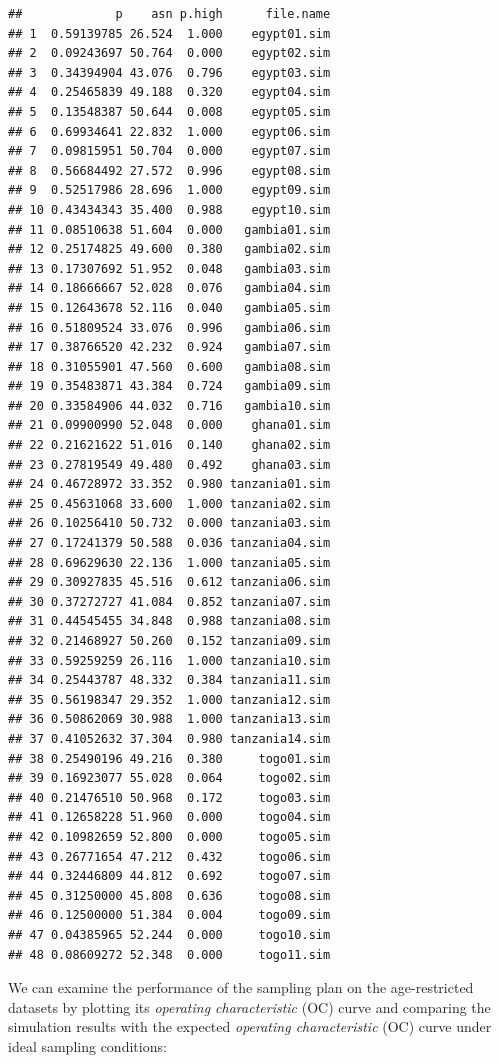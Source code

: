 \documentclass[12pt,a4paper]{book}
\theoremstyle{definition}
\theoremstyle{definition}
\theoremstyle{definition}
\theoremstyle{remark}
\begin{document}
\begin{verbatim}
##             p    asn p.high      file.name
## 1  0.59139785 26.524  1.000    egypt01.sim
## 2  0.09243697 50.764  0.000    egypt02.sim
## 3  0.34394904 43.076  0.796    egypt03.sim
## 4  0.25465839 49.188  0.320    egypt04.sim
## 5  0.13548387 50.644  0.008    egypt05.sim
## 6  0.69934641 22.832  1.000    egypt06.sim
## 7  0.09815951 50.704  0.000    egypt07.sim
## 8  0.56684492 27.572  0.996    egypt08.sim
## 9  0.52517986 28.696  1.000    egypt09.sim
## 10 0.43434343 35.400  0.988    egypt10.sim
## 11 0.08510638 51.604  0.000   gambia01.sim
## 12 0.25174825 49.600  0.380   gambia02.sim
## 13 0.17307692 51.952  0.048   gambia03.sim
## 14 0.18666667 52.028  0.076   gambia04.sim
## 15 0.12643678 52.116  0.040   gambia05.sim
## 16 0.51809524 33.076  0.996   gambia06.sim
## 17 0.38766520 42.232  0.924   gambia07.sim
## 18 0.31055901 47.560  0.600   gambia08.sim
## 19 0.35483871 43.384  0.724   gambia09.sim
## 20 0.33584906 44.032  0.716   gambia10.sim
## 21 0.09900990 52.048  0.000    ghana01.sim
## 22 0.21621622 51.016  0.140    ghana02.sim
## 23 0.27819549 49.480  0.492    ghana03.sim
## 24 0.46728972 33.352  0.980 tanzania01.sim
## 25 0.45631068 33.600  1.000 tanzania02.sim
## 26 0.10256410 50.732  0.000 tanzania03.sim
## 27 0.17241379 50.588  0.036 tanzania04.sim
## 28 0.69629630 22.136  1.000 tanzania05.sim
## 29 0.30927835 45.516  0.612 tanzania06.sim
## 30 0.37272727 41.084  0.852 tanzania07.sim
## 31 0.44545455 34.848  0.988 tanzania08.sim
## 32 0.21468927 50.260  0.152 tanzania09.sim
## 33 0.59259259 26.116  1.000 tanzania10.sim
## 34 0.25443787 48.332  0.384 tanzania11.sim
## 35 0.56198347 29.352  1.000 tanzania12.sim
## 36 0.50862069 30.988  1.000 tanzania13.sim
## 37 0.41052632 37.304  0.980 tanzania14.sim
## 38 0.25490196 49.216  0.380     togo01.sim
## 39 0.16923077 55.028  0.064     togo02.sim
## 40 0.21476510 50.968  0.172     togo03.sim
## 41 0.12658228 51.960  0.000     togo04.sim
## 42 0.10982659 52.800  0.000     togo05.sim
## 43 0.26771654 47.212  0.432     togo06.sim
## 44 0.32446809 44.812  0.692     togo07.sim
## 45 0.31250000 45.808  0.636     togo08.sim
## 46 0.12500000 51.384  0.004     togo09.sim
## 47 0.04385965 52.244  0.000     togo10.sim
## 48 0.08609272 52.348  0.000     togo11.sim
\end{verbatim}

We can examine the performance of the sampling plan on the
age-restricted datasets by plotting its \emph{operating characteristic}
(OC) curve and comparing the simulation results with the expected
\emph{operating characteristic} (OC) curve under ideal sampling
conditions:
\end{document}

